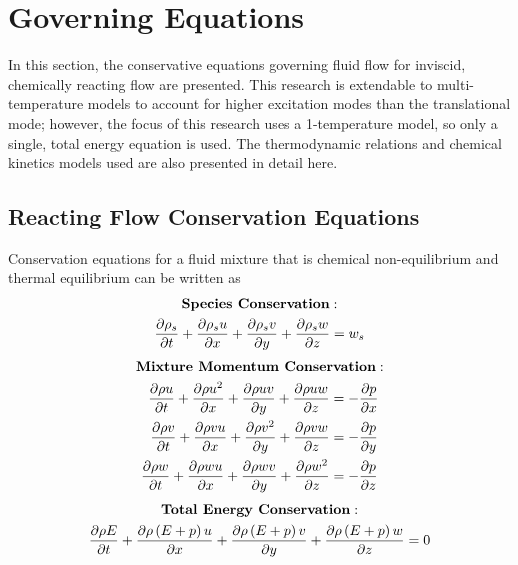 \chapter{Governing Equations}
\label{chapter-two}

In this section, the conservative equations governing fluid flow for inviscid,
chemically reacting flow are presented.  This research is extendable to
multi-temperature models to account for higher excitation modes than the
translational mode; however, the focus of this research uses a 1-temperature
model, so only a single, total energy equation is used.  The thermodynamic
relations and chemical kinetics models used are also presented in detail here.

\section{Reacting Flow Conservation Equations}

Conservation equations for a fluid mixture that is chemical non-equilibrium and
thermal equilibrium can be written as
\begin{equation}
  \begin{gathered}
    \text{\bf{Species Conservation}}: \\
     \frac{\partial \rho_s}{\partial t} + \frac{\partial \rho_s u}{\partial x} + \frac{\partial \rho_s v}{\partial y} + \frac{\partial \rho_s w}{\partial z} =
     w_s
  \end{gathered}
  \label{species-cons}
\end{equation}
\begin{equation}
  \begin{gathered}
    \text{\bf{Mixture Momentum Conservation}}: \\
    \begin{aligned}
    \frac{\partial \rho u}{\partial t} + \frac{\partial \rho u^2}{\partial x} + \frac{\partial \rho u v}{\partial y} + \frac{\partial \rho u w}{\partial z} &= -\frac{\partial p}{\partial x}\\
    \frac{\partial \rho v}{\partial t} + \frac{\partial \rho v u}{\partial x} + \frac{\partial \rho v^2}{\partial y} + \frac{\partial \rho v w}{\partial z} &= -\frac{\partial p}{\partial y}\\
    \frac{\partial \rho w}{\partial t} + \frac{\partial \rho w u}{\partial x} + \frac{\partial \rho w v}{\partial y} + \frac{\partial \rho w^2}{\partial z} &= -\frac{\partial p}{\partial z}
    \end{aligned}
  \end{gathered}
  \label{mix-mom-cons}
\end{equation}
\begin{equation}
  \begin{gathered}
    \text{\bf{Total Energy Conservation}}: \\
     \frac{\partial \rho E}{\partial t} 
    + \frac{\partial \rho \left( E + p \right) u}{\partial x} 
    + \frac{\partial \rho \left( E + p \right) v}{\partial y}
    + \frac{\partial \rho \left( E + p \right) w}{\partial z} = 0
  \end{gathered}
  \label{tot-energy-cons}
\end{equation}

